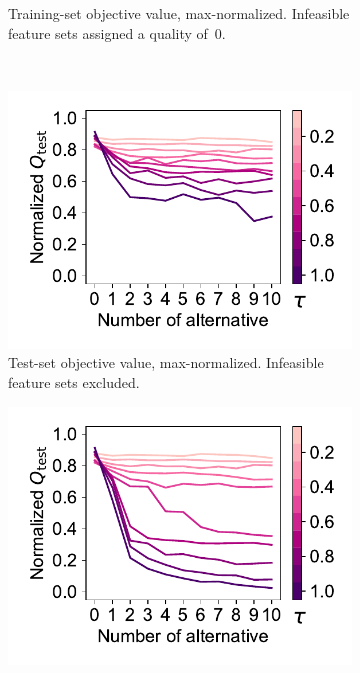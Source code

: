\documentclass{article}
\theoremstyle{definition}
\begin{document}
\begin{figure}[p]
\begin{subfigure}[t]{0.48\textwidth}
		\caption{
			Training-set objective value, max-normalized.
			Infeasible feature sets assigned a quality of~0.
		}
		\label{fig:afs:impact-num-alternatives-tau-train-objective-max-fillna}
	\end{subfigure}
	\\ \vspace{\baselineskip}
	\begin{subfigure}[t]{0.48\textwidth}
		\centering
		\includegraphics[width=\textwidth, trim=15 15 10 15, clip]{plots/afs-impact-num-alternatives-tau-test-objective-max.pdf}
		\caption{
			Test-set objective value, max-norma\-lized.
			Infeasible feature sets excluded.
		}
		\label{fig:afs:impact-num-alternatives-tau-test-objective-max}
	\end{subfigure}
	\hfill
	\begin{subfigure}[t]{0.48\textwidth}
		\centering
		\includegraphics[width=\textwidth, trim=15 15 10 15, clip]{plots/afs-impact-num-alternatives-tau-test-objective-max-fillna.pdf}

\end{subfigure}
\end{figure}
\end{document}
